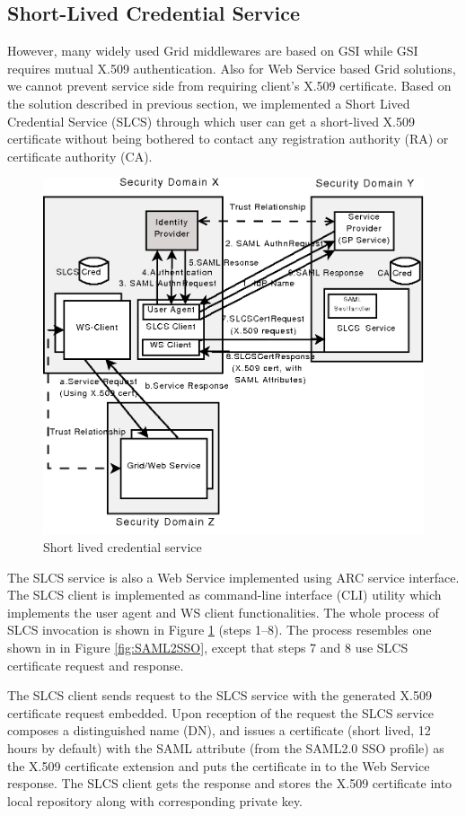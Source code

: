 \documentclass[twocolumn]{svjour3}         %
\begin{document}
\subsection{Short-Lived Credential Service}
\label{sec:slcs}
However, many widely used Grid middlewares are based on GSI while GSI requires mutual X.509 authentication. Also for Web Service based Grid solutions, we cannot prevent service side from requiring client's X.509 certificate.  Based on the solution described in previous section, we implemented a Short Lived Credential Service (SLCS) through which user can get a short-lived X.509 certificate without being bothered to contact any registration authority (RA) or certificate authority (CA).

\begin{figure}
\includegraphics[width=0.9\columnwidth]{SLCS.png}
\caption{Short lived credential service}
\label{fig:SLCS}
\end{figure}
The SLCS service is also a Web Service implemented using ARC service interface. The SLCS client is implemented as command-line interface (CLI) utility which implements the user agent and WS client functionalities. The whole process of SLCS invocation is shown in Figure \ref{fig:SLCS} (steps 1--8). The process resembles one shown in in Figure \ref{fig:SAML2SSO}, except that steps 7 and 8 use SLCS certificate request and response.

The SLCS client sends request to the SLCS service with the generated X.509 certificate request embedded. Upon reception of the request the SLCS service composes a distinguished name (DN), and issues a certificate (short lived, 12 hours by default) with the SAML attribute (from the SAML2.0 SSO profile) as the X.509 certificate extension and puts the certificate in to the Web Service response. The SLCS client gets the response and stores the X.509 certificate into local repository along with corresponding private key.
\end{document}
